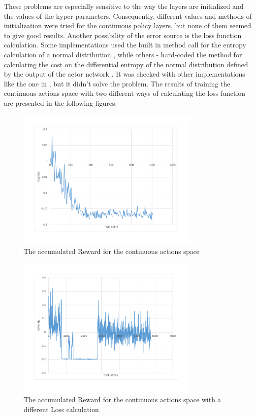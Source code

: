 These problems are especially sensitive to the way the layers are initialized and the values of the hyper-parameters. Consequently, different values and methods of initialization were tried for the continuous policy layers, but none of them seemed to give good results. Another possibility of the error source is the loss function calculation. Some implementations used the built in method call for the entropy calculation of a normal distribution \cite{A3CImplementation}, while others - hard-coded the method for calculating the cost on the differential entropy of the normal distribution defined by the output of the actor network \cite{DBLP:journals/corr/MnihBMGLHSK16}. It was checked with other implementations like the one in \cite{A3CLoss}, but it didn't solve the problem. The results of training the continuous actions space with two different ways of calculating the loss function are presented in the following figures:

\begin{figure}[H]
	\centering
	\includegraphics[width=0.8\textwidth]{Figures/ContinuousLoss1}
	\caption{The accumulated Reward for the continuous actions space}
	\label{fig:ContinuousLoss1}
\end{figure}
\begin{figure}[H]
	\centering
	\includegraphics[width=0.8\textwidth]{Figures/ContinuousLoss2}
	\caption{The accumulated Reward for the continuous actions space with a different Loss calculation}
	\label{fig:ContinuousLoss2}
\end{figure}

